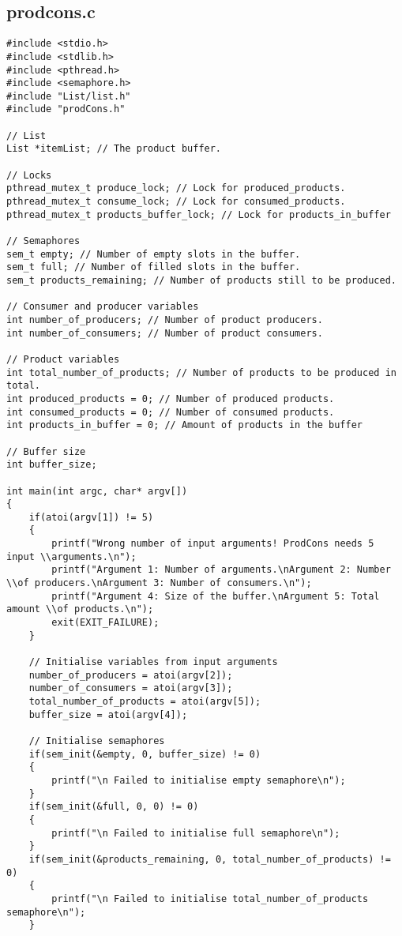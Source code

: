 \subsection{prodcons.c}
\begin{lstlisting}
#include <stdio.h>
#include <stdlib.h>
#include <pthread.h>
#include <semaphore.h>
#include "List/list.h"
#include "prodCons.h"

// List
List *itemList; // The product buffer.

// Locks
pthread_mutex_t produce_lock; // Lock for produced_products.
pthread_mutex_t consume_lock; // Lock for consumed_products.
pthread_mutex_t products_buffer_lock; // Lock for products_in_buffer

// Semaphores
sem_t empty; // Number of empty slots in the buffer.
sem_t full; // Number of filled slots in the buffer.
sem_t products_remaining; // Number of products still to be produced.

// Consumer and producer variables
int number_of_producers; // Number of product producers.
int number_of_consumers; // Number of product consumers.

// Product variables
int total_number_of_products; // Number of products to be produced in total.
int produced_products = 0; // Number of produced products.
int consumed_products = 0; // Number of consumed products.
int products_in_buffer = 0; // Amount of products in the buffer

// Buffer size
int buffer_size;

int main(int argc, char* argv[])
{
	if(atoi(argv[1]) != 5)
	{
		printf("Wrong number of input arguments! ProdCons needs 5 input \\arguments.\n");
		printf("Argument 1: Number of arguments.\nArgument 2: Number \\of producers.\nArgument 3: Number of consumers.\n");
		printf("Argument 4: Size of the buffer.\nArgument 5: Total amount \\of products.\n");
		exit(EXIT_FAILURE);
	}

	// Initialise variables from input arguments
	number_of_producers = atoi(argv[2]);
	number_of_consumers = atoi(argv[3]);
	total_number_of_products = atoi(argv[5]);
	buffer_size = atoi(argv[4]);

	// Initialise semaphores
	if(sem_init(&empty, 0, buffer_size) != 0)
	{
		printf("\n Failed to initialise empty semaphore\n");
	}
	if(sem_init(&full, 0, 0) != 0)
	{
		printf("\n Failed to initialise full semaphore\n");
	}
	if(sem_init(&products_remaining, 0, total_number_of_products) != 0)
	{
		printf("\n Failed to initialise total_number_of_products semaphore\n");
	}


\end{lstlisting}
